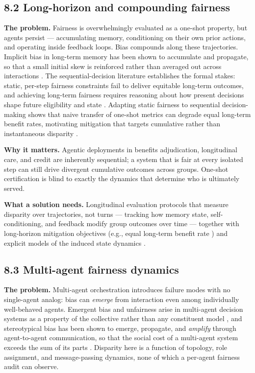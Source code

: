 \documentclass[sigconf,nonacm]{acmart}
\begin{document}
\subsection{8.2 Long-horizon and compounding fairness}

\textbf{The problem.} Fairness is overwhelmingly evaluated as a one-shot property, but agents persist — accumulating memory, conditioning on their own prior actions, and operating inside feedback loops. Bias compounds along these trajectories. Implicit bias in long-term memory has been shown to accumulate and propagate, so that a small initial skew is reinforced rather than averaged out across interactions \cite{ma2026implicit}. The sequential-decision literature establishes the formal stakes: static, per-step fairness constraints fail to deliver equitable long-term outcomes, and achieving long-term fairness requires reasoning about how present decisions shape future eligibility and state \cite{hu2022achieving}. Adapting static fairness to sequential decision-making shows that naive transfer of one-shot metrics can degrade equal long-term benefit rates, motivating mitigation that targets cumulative rather than instantaneous disparity \cite{xu2024adapting}.

\textbf{Why it matters.} Agentic deployments in benefits adjudication, longitudinal care, and credit are inherently sequential; a system that is fair at every isolated step can still drive divergent cumulative outcomes across groups. One-shot certification is blind to exactly the dynamics that determine who is ultimately served.

\textbf{What a solution needs.} Longitudinal evaluation protocols that measure disparity over trajectories, not turns — tracking how memory state, self-conditioning, and feedback modify group outcomes over time — together with long-horizon mitigation objectives (e.g., equal long-term benefit rate \cite{xu2024adapting}) and explicit models of the induced state dynamics \cite{hu2022achieving}.

\subsection{8.3 Multi-agent fairness dynamics}

\textbf{The problem.} Multi-agent orchestration introduces failure modes with no single-agent analog: bias can \emph{emerge} from interaction even among individually well-behaved agents. Emergent bias and unfairness arise in multi-agent decision systems as a property of the collective rather than any constituent model \cite{madigan2025emergent}, and stereotypical bias has been shown to emerge, propagate, and \emph{amplify} through agent-to-agent communication, so that the social cost of a multi-agent system exceeds the sum of its parts \cite{nguyen2025social}. Disparity here is a function of topology, role assignment, and message-passing dynamics, none of which a per-agent fairness audit can observe.
\end{document}
